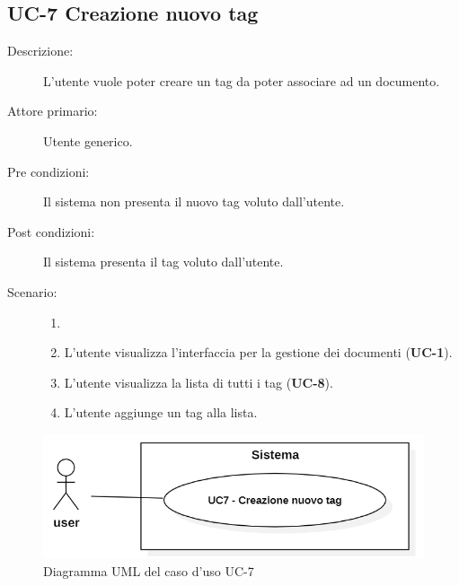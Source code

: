 \subsection{UC-7 Creazione nuovo tag}
\begin{description}
    \item[Descrizione:] L’utente vuole poter creare un tag da poter associare ad un documento.
    \item[Attore primario:] Utente generico.
    \item[Pre condizioni:] Il sistema non presenta il nuovo tag voluto dall’utente.
    \item[Post condizioni:] Il sistema presenta il tag voluto dall’utente.
    \item[Scenario:]
    \begin{enumerate}
        \item[] 
        \item L’utente visualizza l'interfaccia per la gestione dei documenti (\textbf{UC-1}).
        \item L’utente visualizza la lista di tutti i tag (\textbf{UC-8}).
        \item L'utente aggiunge un tag alla lista.
    \end{enumerate}
\end{description}

\begin{figure}[H]
    \centering
    \includegraphics[width=0.8\linewidth]{UC7.PNG}
    \caption{Diagramma UML del caso d'uso UC-7}
    \label{fig:UC7}
\end{figure}

